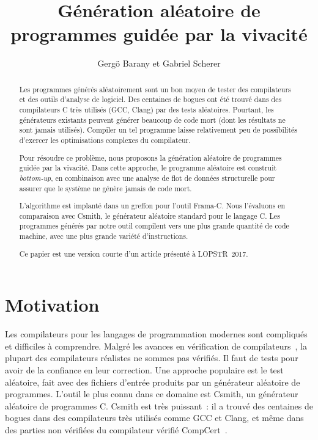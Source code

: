 \documentclass[a4paper]{easychair}
\title{Génération aléatoire de programmes guidée par la vivacité}
\author{Gergö Barany\inst{1} et Gabriel Scherer\inst{2}}
\institute{
Inria Paris \\
\email{gergo.barany@inria.fr}
\and
Inria Saclay \\
\email{gabriel.scherer@gmail.com}
}
\newcommand{\anglais}[1]{\textit{#1}}
\begin{document}
\maketitle
\thispagestyle{plain}

\begin{abstract}
Les programmes générés aléatoirement sont un bon moyen de tester des
compilateurs et des outils d'analyse de logiciel. Des centaines de bogues
ont été trouvé dans des compilateurs C très utilisés (GCC, Clang) par des
tests aléatoires. Pourtant, les générateurs existants peuvent générer
beaucoup de code mort (dont les résultats ne sont jamais utilisés). Compiler
un tel programme laisse relativement peu de possibilités d'exercer les
optimisations complexes du compilateur.

Pour résoudre ce problème, nous proposons la génération aléatoire de
programmes guidée par la vivacité. Dans cette approche, le programme aléatoire
est construit \anglais{bottom-up}, en combinaison avec une analyse de flot de
données structurelle pour assurer que le système ne génère jamais de code
mort.

L'algorithme est implanté dans un greffon pour l'outil Frama-C. Nous
l'évaluons en comparaison avec Csmith, le générateur aléatoire standard pour
le langage C. Les programmes générés par notre outil compilent vers une plus
grande quantité de code machine, avec une plus grande variété
d'instructions.

Ce papier est une version courte d'un article présenté à LOPSTR~2017.
\end{abstract}



\section{Motivation}

Les compilateurs pour les langages de programmation modernes sont
compliqués et difficiles à comprendre. Malgré les avances en vérification de
compilateurs~\cite{leroy-2009,tan-2016}, la plupart des compilateurs
réalistes ne sommes pas vérifiés. Il faut de tests pour avoir de la
confiance en leur correction. Une approche populaire est le test aléatoire,
fait avec des fichiers d'entrée produits par un générateur aléatoire de
programmes. L'outil le plus connu dans ce domaine est Csmith, un générateur
aléatoire de programmes C. Csmith est très puissant~: il a trouvé des
centaines de bogues dans des compilateurs très utilisés comme GCC et Clang,
et même dans des parties non vérifiées du compilateur vérifié
CompCert~\cite{csmith-2011}.
\end{document}
